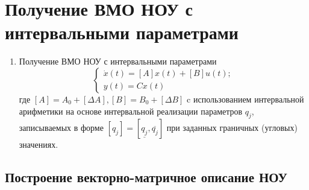 \section{Получение ВМО НОУ с интервальными параметрами}

\begin{enumerate}
	\item Получение ВМО НОУ с интервальными параметрами
	\begin{equation}\label{VMO}
		\begin{cases}
			\dot x (t)  = [A] x(t) + [B] u(t);\\
			y(t) = C x(t)			
		\end{cases}
	\end{equation}
	где $[A] = A_0 + [\Delta A], [B] = B_0 + [\Delta B]$
	c использованием интервальной арифметики на основе интервальной реализации параметров $q_j$, записываемых в форме $[q_j] = [\underline{q_j}, \overline{q_j}]$ при заданных граничных (угловых) значениях.
\end{enumerate}

\subsection{Построение векторно-матричное описание НОУ}



\newpage